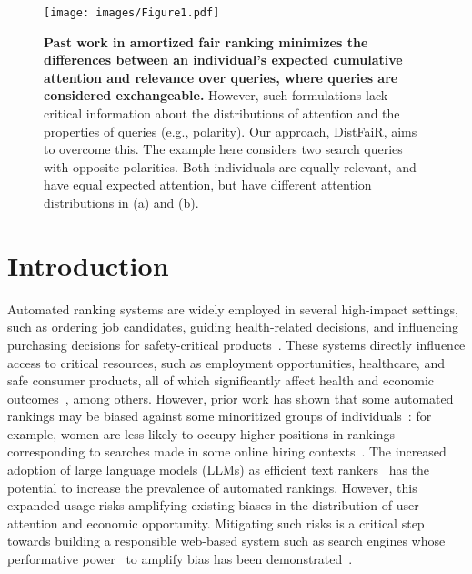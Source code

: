 \begin{figure}[htb!]
\centering
\begin{minipage}[htb!]
{\linewidth}
\centering
\texttt{[image: images/Figure1.pdf]}

\caption{\textbf{Past work in amortized fair ranking minimizes the differences between an individual's expected cumulative attention and relevance over queries, where queries are considered exchangeable.}  However, such formulations lack critical information about the distributions of attention and the properties of queries (e.g., polarity).  Our approach, DistFaiR, aims to overcome this.  The example here considers two search queries with opposite polarities. Both individuals are equally relevant, and have equal expected attention, but have different attention distributions in (a) and (b).}
\label{fig:need_for_distributions}
\end{minipage}
\end{figure}

\section{Introduction}
\label{submission}
Automated ranking systems are widely employed in several high-impact settings, such as ordering job candidates, guiding health-related decisions, and influencing purchasing decisions for safety-critical products~\cite{clarke2020overview,zeide2022silicon, zehlike2020reducing,hajian2016algorithmic}.
These systems directly influence access to critical resources, such as employment opportunities, healthcare, and safe consumer products, all of which significantly affect health and economic outcomes~\cite{saito2022fair,garcia2021maxmin,fabbri2020effect}, among others. However, prior work has shown that some automated rankings may be biased against some minoritized groups of individuals~\cite{biega2018equity,geyik2019fairness}: for example, women are less likely to occupy higher positions in rankings corresponding to searches made in some online hiring contexts~\cite{chen2018investigating}. The increased adoption of large language models (LLMs) as efficient text rankers~\cite{sanner2023large,zhuang2023open,hou2023large,gao2023chat} has the potential to increase the prevalence of automated rankings. However, this expanded usage risks amplifying existing biases in the distribution of user attention and economic opportunity. Mitigating such risks is a critical step towards building a responsible web-based system such as search engines whose performative power~\cite{hardt2022performative} to amplify bias has been demonstrated~\cite{mendler2024engine}.  

